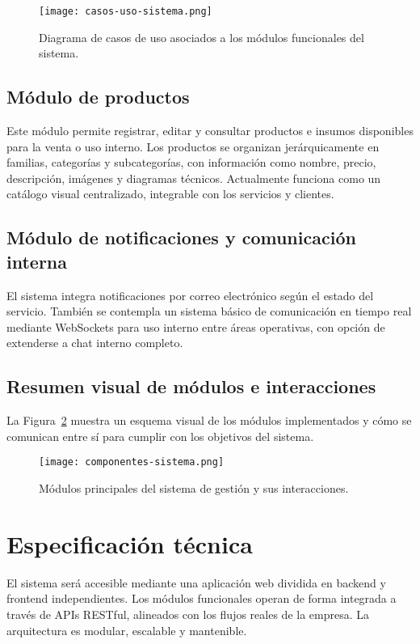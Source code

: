 \begin{figure}[H]
	\centering
	\texttt{[image: casos-uso-sistema.png]}
	\caption{Diagrama de casos de uso asociados a los módulos funcionales del sistema.}
	\label{fig:casosuso}
\end{figure}

\subsection*{Módulo de productos}

Este módulo permite registrar, editar y consultar productos e insumos disponibles para la venta o uso interno. Los productos se organizan jerárquicamente en familias, categorías y subcategorías, con información como nombre, precio, descripción, imágenes y diagramas técnicos. Actualmente funciona como un catálogo visual centralizado, integrable con los servicios y clientes.

\subsection*{Módulo de notificaciones y comunicación interna}

El sistema integra notificaciones por correo electrónico según el estado del servicio. También se contempla un sistema básico de comunicación en tiempo real mediante WebSockets para uso interno entre áreas operativas, con opción de extenderse a chat interno completo.

\subsection*{Resumen visual de módulos e interacciones}

La Figura~\ref{fig:modulos} muestra un esquema visual de los módulos implementados y cómo se comunican entre sí para cumplir con los objetivos del sistema.

\begin{figure}[H]
	\centering
	\texttt{[image: componentes-sistema.png]}
	\caption{Módulos principales del sistema de gestión y sus interacciones.}
	\label{fig:modulos}
\end{figure}

	
\section{Especificación técnica}

El sistema será accesible mediante una aplicación web dividida en backend y frontend independientes. Los módulos funcionales operan de forma integrada a través de APIs RESTful, alineados con los flujos reales de la empresa. La arquitectura es modular, escalable y mantenible.

